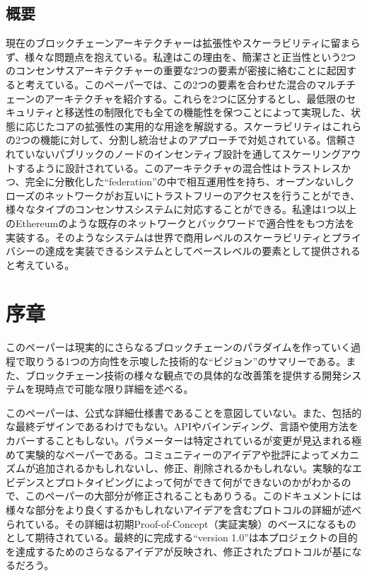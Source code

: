 \hypertarget{ux6982ux8981}{%
\subsection{概要}\label{ux6982ux8981}}

現在のブロックチェーンアーキテクチャーは拡張性やスケーラビリティに留まらず、様々な問題点を抱えている。私達はこの理由を、簡潔さと正当性という2つのコンセンサスアーキテクチャーの重要な2つの要素が密接に絡むことに起因すると考えている。このペーパーでは、この2つの要素を合わせた混合のマルチチェーンのアーキテクチャを紹介する。これらを2つに区分するとし、最低限のセキュリティと移送性の制限化でも全ての機能性を保つことによって実現した、状態に応じたコアの拡張性の実用的な用途を解説する。スケーラビリティはこれらの2つの機能に対して、分割し統治せよのアプローチで対処されている。信頼されていないパブリックのノードのインセンティブ設計を通してスケーリングアウトするように設計されている。このアーキテクチャの混合性はトラストレスかつ、完全に分散化した``federation''の中で相互運用性を持ち、オープンないしクローズのネットワークがお互いにトラストフリーのアクセスを行うことができ、様々なタイプのコンセンサスシステムに対応することができる。私達は1つ以上のEthereumのような既存のネットワークとバックワードで適合性をもつ方法を実装する。そのようなシステムは世界で商用レベルのスケーラビリティとプライバシーの達成を実装できるシステムとしてベースレベルの要素として提供されると考えている。

\hypertarget{ux5e8fux7ae0}{%
\section{序章}\label{ux5e8fux7ae0}}

このペーパーは現実的にさらなるブロックチェーンのパラダイムを作っていく過程で取りうる1つの方向性を示唆した技術的な``ビジョン''のサマリーである。また、ブロックチェーン技術の様々な観点での具体的な改善策を提供する開発システムを現時点で可能な限り詳細を述べる。

このペーパーは、公式な詳細仕様書であることを意図していない。また、包括的な最終デザインであるわけでもない。APIやバインディング、言語や使用方法をカバーすることもしない。パラメーターは特定されているが変更が見込まれる極めて実験的なペーパーである。コミュニティーのアイデアや批評によってメカニズムが追加されるかもしれないし、修正、削除されるかもしれない。実験的なエビデンスとプロトタイピングによって何ができて何ができないのかがわかるので、このペーパーの大部分が修正されることもありうる。このドキュメントには様々な部分をより良くするかもしれないアイデアを含むプロトコルの詳細が述べられている。その詳細は初期Proof-of-Concept（実証実験）のベースになるものとして期待されている。最終的に完成する``version
1.0''は本プロジェクトの目的を達成するためのさらなるアイデアが反映され、修正されたプロトコルが基になるだろう。

